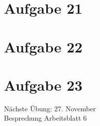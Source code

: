 \documentclass[9pt,german]{beamer}%
\begin{document}
\section{Aufgabe 21}

\section{Aufgabe 22}

\section{Aufgabe 23}


\begin{frame}
\centering
\Huge{}
\vspace{2cm}

{\LARGE
N\"achste \"Ubung: 27. November\\
Besprechung Arbeitsblatt 6
}
\end{frame}


\end{document}
